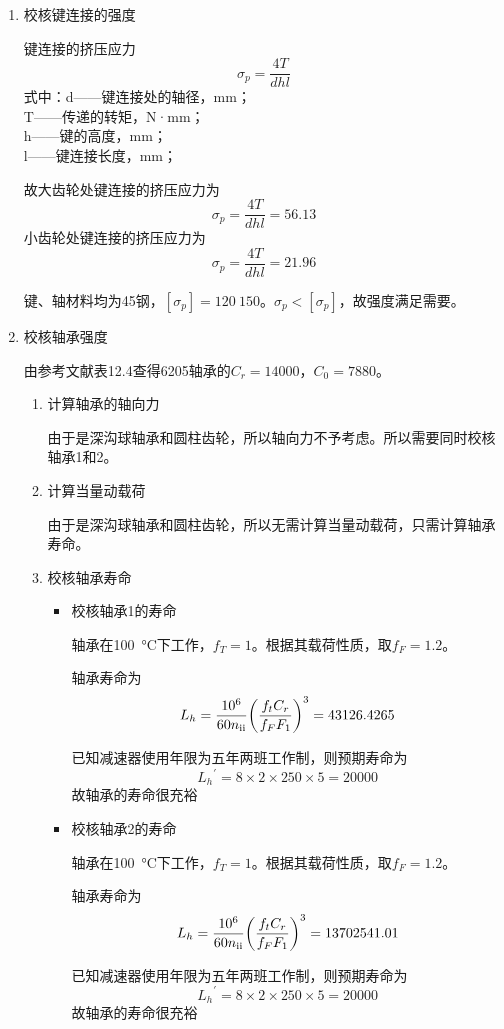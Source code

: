 \begin{enumerate}[A]
	\item 校核键连接的强度
	\par 键连接的挤压应力\\$$\sigma_p=\dfrac{4T}{dhl}$$
	式中：d——键连接处的轴径，mm；\\
	T——传递的转矩，N·mm；\\
	h——键的高度，mm；\\
	l——键连接长度，mm；
	\par 故大齿轮处键连接的挤压应力为$$\sigma_p=\dfrac{4T}{dhl}=56.13$$小齿轮处键连接的挤压应力为$$\sigma_p=\dfrac{4T}{dhl}=21.96$$
	\par 键、轴材料均为45钢，$\left[\sigma_p\right]= 120~150$。$\sigma_p<\left[\sigma_p\right]$，故强度满足需要。
	\item 校核轴承强度
	\par 由参考文献\cite{1}表12.4查得6205轴承的$C_r=14000$，$C_0=7880$。
	\begin{enumerate}[a]
		\item 计算轴承的轴向力
		\par 由于是深沟球轴承和圆柱齿轮，所以轴向力不予考虑。所以需要同时校核轴承1和2。
		\item 计算当量动载荷
		\par 由于是深沟球轴承和圆柱齿轮，所以无需计算当量动载荷，只需计算轴承寿命。
		\item 校核轴承寿命
		\begin{itemize}
			\item 校核轴承1的寿命
			\par 轴承在\SI{100}{\degreeCelsius}下工作，$f_T=1$。根据其载荷性质，取$f_F=1.2$。
			\par 轴承寿命为
			$$L_h=\dfrac{10^6}{60n_{\mathrm{\uppercase\expandafter{\romannumeral2}}}}{\left(\dfrac{f_tC_r}{f_FF_1}\right)}^3=43126.4265$$
			\par 已知减速器使用年限为五年两班工作制，则预期寿命为
			$${L_h}^{\prime}=8\times 2\times 250\times 5=20000$$
			故轴承的寿命很充裕
			\item 校核轴承2的寿命
			\par 轴承在\SI{100}{\degreeCelsius}下工作，$f_T=1$。根据其载荷性质，取$f_F=1.2$。
			\par 轴承寿命为
			$$L_h=\dfrac{10^6}{60n_{\mathrm{\uppercase\expandafter{\romannumeral2}}}}{\left(\dfrac{f_tC_r}{f_FF_1}\right)}^3=13702541.01$$
			\par 已知减速器使用年限为五年两班工作制，则预期寿命为
			$${L_h}^{\prime}=8\times 2\times 250\times 5=20000$$
			故轴承的寿命很充裕
		\end{itemize}
	\end{enumerate}
\end{enumerate}